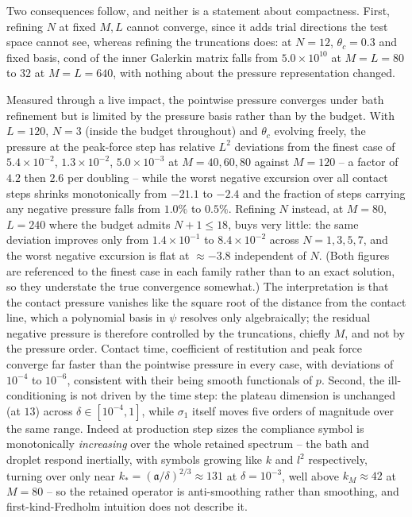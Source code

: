 Two consequences follow, and neither is a statement about compactness. First, refining $N$ at fixed $M,L$ cannot converge, since it adds trial directions the test space cannot see, whereas refining the truncations does: at $N=12$, $\theta_c=0.3$ and fixed basis, $\mathrm{cond}$ of the inner Galerkin matrix falls from $5.0\times10^{10}$ at $M=L=80$ to $32$ at $M=L=640$, with nothing about the pressure representation changed.

Measured through a live impact, the pointwise pressure converges under bath refinement but is limited by the pressure basis rather than by the budget. With $L=120$, $N=3$ (inside the budget throughout) and $\theta_c$ evolving freely, the pressure at the peak-force step has relative $L^2$ deviations from the finest case of $5.4\times10^{-2}$, $1.3\times10^{-2}$, $5.0\times10^{-3}$ at $M=40,60,80$ against $M=120$ -- a factor of $4.2$ then $2.6$ per doubling -- while the worst negative excursion over all contact steps shrinks monotonically from $-21.1$ to $-2.4$ and the fraction of steps carrying any negative pressure falls from $1.0\%$ to $0.5\%$. Refining $N$ instead, at $M=80$, $L=240$ where the budget admits $N+1\le18$, buys very little: the same deviation improves only from $1.4\times10^{-1}$ to $8.4\times10^{-2}$ across $N=1,3,5,7$, and the worst negative excursion is flat at $\approx-3.8$ independent of $N$. (Both figures are referenced to the finest case in each family rather than to an exact solution, so they understate the true convergence somewhat.) The interpretation is that the contact pressure vanishes like the square root of the distance from the contact line, which a polynomial basis in $\psi$ resolves only algebraically; the residual negative pressure is therefore controlled by the truncations, chiefly $M$, and not by the pressure order. Contact time, coefficient of restitution and peak force converge far faster than the pointwise pressure in every case, with deviations of $10^{-4}$ to $10^{-6}$, consistent with their being smooth functionals of $p$. Second, the ill-conditioning is not driven by the time step: the plateau dimension is unchanged (at $13$) across $\delta\in[10^{-4},1]$, while $\sigma_1$ itself moves five orders of magnitude over the same range. Indeed at production step sizes the compliance symbol is monotonically \emph{increasing} over the whole retained spectrum -- the bath and droplet respond inertially, with symbols growing like $k$ and $l^2$ respectively, turning over only near $k_\ast=(\mathfrak a/\delta)^{2/3}\approx131$ at $\delta=10^{-3}$, well above $k_M\approx42$ at $M=80$ -- so the retained operator is anti-smoothing rather than smoothing, and first-kind-Fredholm intuition does not describe it.

